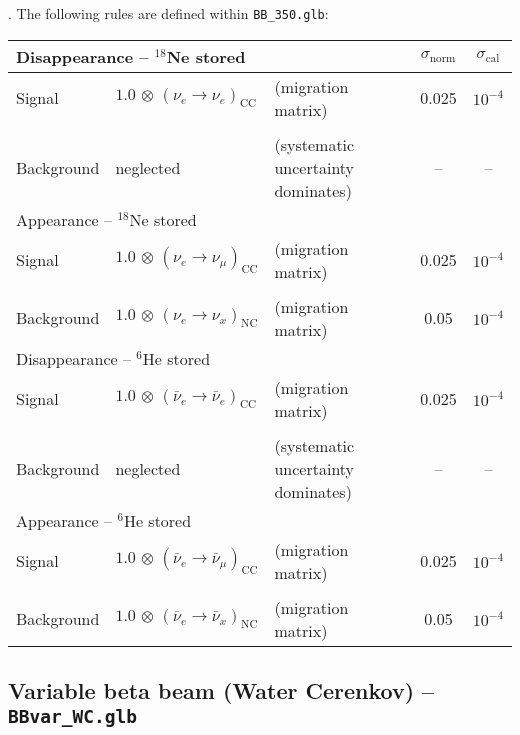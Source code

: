 \cite{Burguet-Castell:2005pa}. The following rules are defined within {\tt BB\_350.glb}:
\begin{center}
\begin{tabular}{|l|ll|c|c|}
\hline \hline
\multicolumn{3}{|l|}{Disappearance -- $^{18}$Ne stored} & $\sigma_\mathrm{norm}$ & $\sigma_\mathrm{cal}$ \\ \hline
Signal & $1.0 \, \otimes \, (\nu_e\rightarrow\nu_e)_{\mathrm{CC}}$ & (migration matrix) & 0.025 & $10^{-4}$ \\
 & & & & \\
Background & neglected & (systematic uncertainty dominates) & -- & -- \\ \hline \hline 
\multicolumn{3}{|l|}{Appearance -- $^{18}$Ne stored} & & \\ \hline
Signal & $1.0 \, \otimes \, (\nu_e \rightarrow \nu_\mu)_\mathrm{CC}$ & (migration matrix) & 0.025 & $10^{-4}$ \\
 & & & & \\
Background & $1.0 \, \otimes \, (\nu_e \rightarrow \nu_x)_\mathrm{NC}$ & (migration matrix) & 0.05 & $10^{-4}$
\\ \hline \hline
\multicolumn{3}{|l|}{Disappearance -- $^6$He stored} & &  \\ \hline
Signal & $1.0 \, \otimes \, (\bar{\nu}_e\rightarrow\bar{\nu}_e)_{\mathrm{CC}}$ & (migration matrix) & 0.025 & $10^{-4}$ \\
 & & & & \\
Background & neglected & (systematic uncertainty dominates) & -- & -- \\ \hline \hline 
\multicolumn{3}{|l|}{Appearance -- $^6$He stored} & & \\ \hline
Signal & $1.0 \, \otimes \, (\bar{\nu}_e \rightarrow \bar{\nu}_\mu)_\mathrm{CC}$ & (migration matrix)  &
0.025 & $10^{-4}$ \\
 & & & & \\
Background & $1.0 \, \otimes \, (\bar{\nu}_e \rightarrow \bar{\nu}_x)_\mathrm{NC}$ & (migration matrix) & 0.05 & $10^{-4}$ \\ \hline \hline
\end{tabular}
\end{center}

\subsection*{Variable beta beam (Water Cerenkov) -- {\tt BBvar\_WC.glb}}


